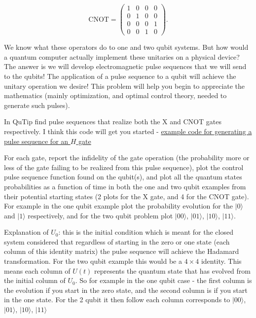 \documentclass[12pt]{article}
\newcommand{\ket}[1]{| #1 \rangle}
\begin{document}
\begin{equation}
    \text{CNOT} = 
    \begin{pmatrix}
        1 & 0 & 0 & 0 \\
        0 & 1 & 0 & 0 \\
        0 & 0 & 0 & 1 \\
        0 & 0 & 1 & 0
    \end{pmatrix}.
\label{eq:cnot_matrix}
\end{equation}

We know what these operators do to one and two qubit systems. But how would a quantum computer actually implement these unitaries on a physical device? The answer is we will develop electromagnetic pulse sequences that we will send to the qubits! The application of a pulse sequence to a qubit will achieve the unitary operation we desire! This problem will help you begin to appreciate the mathematics (mainly optimization, and optimal control theory, needed to generate such pulses).

In QuTip find pulse sequences that realize both the X and CNOT gates respectively. I think this code will get you started - \href{https://github.com/qutip/qutip-notebooks/blob/master/examples/control-pulseoptim-Hadamard.ipynb}{example code for generating a pulse sequence for an $H$ gate}


For each gate, report the infidelity of the gate operation (the probability more or less of the gate failing to be realized from this pulse sequence), plot the control pulse sequence function found on the qubit(s), and plot all the quantum states probabilities as a function of time in both the one and two qubit examples from their potential starting states (2 plots for the X gate, and 4 for the CNOT gate). For example in the one qubit example plot the probability evolution for the $\ket{0}$ and $\ket{1}$ respectively, and for the two qubit problem plot $\ket{00}$, $\ket{01}$, $\ket{10}$, $\ket{11}$.

Explanation of $U_0$: this is the initial condition which is meant for the closed system considered that regardless of starting in the zero or one state (each column of this identity matrix) the pulse sequence will achieve the Hadamard transformation. For the two qubit example this would be a $4\times 4$ identity. This means each column of $U(t)$ represents the quantum state that has evolved from the initial column of $U_0$. So for example in the one qubit case - the first column is the evolution if you start in the zero state, and the second column is if you start in the one state. For the 2 qubit it then follow each column corresponds to $\ket{00}$, $\ket{01}$, $\ket{10}$, $\ket{11}$
\end{document}
